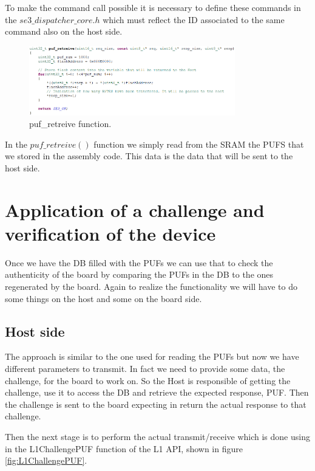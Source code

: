To make the command call possible it is necessary to define these commands in the $se3\_dispatcher\_core.h$ which must reflect the ID associated to the same command also on the host side.

\begin{figure}[h!]
	\vspace{0.5cm}
	\includegraphics[width = 0.8\textwidth]{images/puf_retreive.png}
	\caption{puf\_retreive function. }
	\label{fig:puf_retreive}
\end{figure}

In the $puf\_retreive()$ function we simply read from the SRAM the PUFS that we stored in the assembly code. This data is the data that will be sent to the host side.


\section {Application of a challenge and verification of the device} 
\label{section:impl_host}

Once we have the DB filled with the PUFs we can use that to check the authenticity of the board by comparing the PUFs in the DB to the ones regenerated by the board. Again to realize the functionality we will have to do some things on the host and some on the board side.

\subsection{Host side}

The approach is similar to the one used for reading the PUFs but now we have different parameters to transmit. In fact we need to provide some data, the challenge, for the board to work on. So the Host is responsible of getting the challenge, use it to access the DB and retrieve the expected response, PUF. Then the challenge is sent to the board expecting in return the actual response to that challenge.

Then the next stage is to perform the actual transmit/receive which is done using in the L1ChallengePUF function of the L1 API, shown in figure \ref{fig:L1ChallengePUF}.

